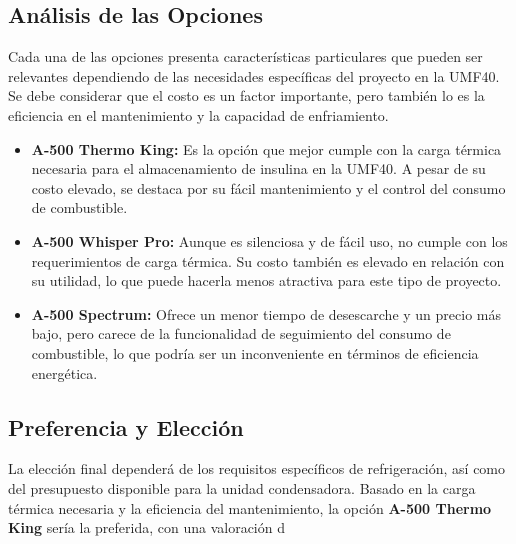  \subsection{Análisis de las Opciones}
 Cada una de las opciones presenta características particulares que pueden ser relevantes dependiendo de las necesidades específicas del proyecto en la UMF40. Se debe considerar que el costo es un factor importante, pero también lo es la eficiencia en el mantenimiento y la capacidad de enfriamiento.
 
 \begin{itemize}
 	\item \textbf{A-500 Thermo King:} Es la opción que mejor cumple con la carga térmica necesaria para el almacenamiento de insulina en la UMF40. A pesar de su costo elevado, se destaca por su fácil mantenimiento y el control del consumo de combustible.
 	\item \textbf{A-500 Whisper Pro:} Aunque es silenciosa y de fácil uso, no cumple con los requerimientos de carga térmica. Su costo también es elevado en relación con su utilidad, lo que puede hacerla menos atractiva para este tipo de proyecto.
 	\item \textbf{A-500 Spectrum:} Ofrece un menor tiempo de desescarche y un precio más bajo, pero carece de la funcionalidad de seguimiento del consumo de combustible, lo que podría ser un inconveniente en términos de eficiencia energética.
 \end{itemize}
 
 \subsection{Preferencia y Elección}
 La elección final dependerá de los requisitos específicos de refrigeración, así como del presupuesto disponible para la unidad condensadora. Basado en la carga térmica necesaria y la eficiencia del mantenimiento, la opción \textbf{A-500 Thermo King} sería la preferida, con una valoración d
 
 
 
 
 
 
 
 
  
